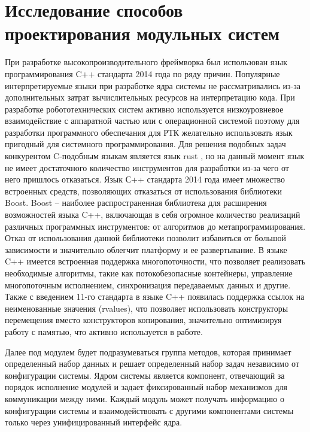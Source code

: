 \section{Исследование способов проектирования модульных систем}

При разработке высокопроизводительного фреймворка был 
использован язык программирования C++ стандарта 2014 года по 
ряду причин. Популярные интерпретируемые языки при разработке 
ядра системы не рассматривались из-за дополнительных затрат 
вычислительных ресурсов на интерпретацию кода. При разработке 
робототехнических систем активно используется низкоуровневое 
взаимодействие с аппаратной частью или с операционной системой 
поэтому для разработки программного обеспечания для РТК 
желательно использовать язык пригодный для системного 
программирования. Для решения подобных задач конкурентом 
C-подобным языкам является язык rust \cite{matsakis2014rust}, но 
на данный момент язык не имеет достаточного количество 
инструментов для разработки из-за чего от него пришлось 
отказаться. Язык С++ стандарта 2014 года имеет множество 
встроенных средств, позволяющих отказаться от использования 
библиотеки Boost. Boost – наиболее распространенная библиотека 
для расширения возможностей языка C++, включающая в себя 
огромное количество реализаций различных программных 
инструментов: от алгоритмов до метапрограммирования. 
Отказ от использования данной библиотеки позволит избавиться от 
большой зависимости и значительно облегчит платформу и ее 
развертывание. В языке C++ имеется встроенная поддержка 
многопоточности, что позволяет реализовать необходимые 
алгоритмы, такие как потокобезопасные контейнеры, управление 
многопоточным исполнением, синхронизация передаваемых данных и 
другие. Также с введением 11-го стандарта в языке C++ появилась 
поддержка ссылок на неименованные значения (rvalues), что 
позволяет использовать конструкторы перемещения вместо 
конструкторов копирования, значительно оптимизируя работу с 
памятью, что активно используется в работе.

Далее под модулем будет подразумеваться группа методов, которая 
принимает определенный набор данных и решает определенный набор 
задач независимо от конфигурации системы. Ядром системы является 
компонент, отвечающий за порядок исполнение модулей и задает 
фиксированный набор механизмов для коммуникации между ними. 
Каждый модуль может получать информацию о конфигурации системы и 
взаимодействовать с другими компонентами системы только через 
унифицированный интерфейс ядра.

